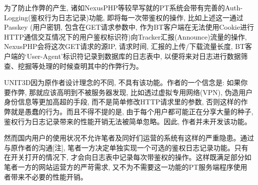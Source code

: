 为了防止作弊的产生, 诸如NexusPHP等较早写就的PT系统会带有完善的Auth-Logging(鉴权行为日志记录)功能, 即将每一次带鉴权的操作, 比如上述这一通过Passkey (用户密钥, 包含在GET请求参数中, 作为BT客户端在无法使用Cookie进行HTTP通信交互情况下的用户鉴权标识符)向Tracker汇报(Announce)流量的操作, NexusPHP会将这次GET请求的源IP, 请求时间, 汇报的上传/下载流量长度, BT客户端的`User-Agent'标识符记录到数据库的日志表中, 以便将来对日志进行数据筛查、挖掘等处理的时候查明其中的作弊行为。

UNIT3D因为原作者设计理念的不同, 不具有该功能。作者的一个信念是: 如果你要作弊, 那就应该高明到不被服务器发现, 比如透过虚拟专用网络(VPN), 伪造用户身份信息等更加高超的手段, 而不是简单修改HTTP请求里的参数, 否则这样的作弊就是愚蠢的行为。而且不得不提的是, 由于每个用户都可能正在分享大量的种子, 鉴权行为日志记录带来的性能开销无法被简单忽略。因此, 作者并未开发该功能。

然而国内用户的使用状况不允许笔者及同好们运营的系统有这样的严重隐患。通过与原作者的沟通[注], 笔者一方决定单独实现一个可选的鉴权日志记录功能。只有在开关打开的情况下, 才会向日志表中记录每次带鉴权的操作。这样既满足部分如笔者一方的网站运营方的严苛需求, 又不为不需要这一功能的PT服务端程序使用者带来不必要的性能开销。





